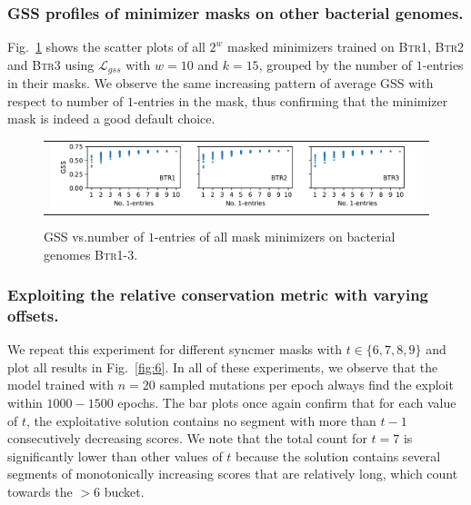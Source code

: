 \subsubsection{GSS profiles of minimizer masks on other bacterial genomes.} Fig.~\ref{fig:4b} shows the scatter plots of all $2^w$ masked minimizers trained on \textsc{Btr1}, \textsc{Btr2} and \textsc{Btr3} using $\mathcal{L}_{gss}$ with $w=10$ and $k=15$, grouped by the number of $1$-entries in their masks. We observe the same increasing pattern of average GSS with respect to number of $1$-entries in the mask, thus confirming that the minimizer mask is indeed a good default choice.

\begin{figure}[ht]
\centering
\begin{tabular}{c}
\hspace{-3mm}\includegraphics[scale=0.78]{masked_mnz_plots/fig4/exp7b.pdf}
\end{tabular}
\caption{GSS vs.\@ number of $1$-entries of all mask minimizers on bacterial genomes \textsc{Btr1-3}.}
\label{fig:4b}
\end{figure}

\subsubsection{Exploiting the relative conservation metric with varying offsets.} We repeat this experiment for different syncmer masks with $t\in\{6,7,8,9\}$ and plot all results in Fig.~\ref{fig:6}. In all of these experiments, we observe that the model trained with $n=20$ sampled mutations per epoch always find the exploit within $1000-1500$ epochs. The bar plots once again confirm that for each value of $t$, the exploitative solution contains no segment with more than $t-1$ consecutively decreasing scores. We note that the total count for $t=7$ is significantly lower than other values of $t$ because the solution contains several segments of monotonically increasing scores that are relatively long, which count towards the $>6$ bucket.

